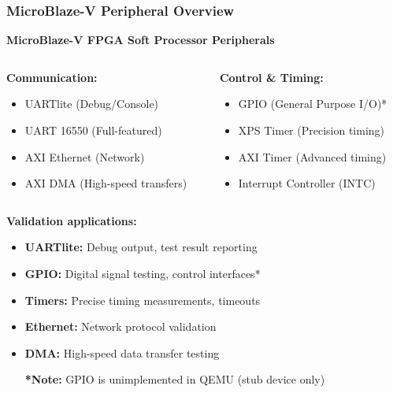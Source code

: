 \documentclass{beamer}
\begin{document}
\begin{frame}
\frametitle{MicroBlaze-V Peripheral Overview}

\begin{center}
\textbf{MicroBlaze-V FPGA Soft Processor Peripherals}
\end{center}

\begin{columns}[T]
\begin{column}{0.5\textwidth}
\textbf{Communication:}
\begin{itemize}
    \item \footnotesize UARTlite (Debug/Console)
    \item \footnotesize UART 16550 (Full-featured)
    \item \footnotesize AXI Ethernet (Network)
    \item \footnotesize AXI DMA (High-speed transfers)
\end{itemize}
\end{column}
\begin{column}{0.5\textwidth}
\textbf{Control \& Timing:}
\begin{itemize}
    \item \footnotesize GPIO (General Purpose I/O)*
    \item \footnotesize XPS Timer (Precision timing)
    \item \footnotesize AXI Timer (Advanced timing)
    \item \footnotesize Interrupt Controller (INTC)
\end{itemize}
\end{column}
\end{columns}

\vspace{0.5cm}
\textbf{Validation applications:}
\begin{itemize}
    \item \footnotesize \textbf{UARTlite:} Debug output, test result reporting
    \item \footnotesize \textbf{GPIO:} Digital signal testing, control interfaces*
    \item \footnotesize \textbf{Timers:} Precise timing measurements, timeouts
    \item \footnotesize \textbf{Ethernet:} Network protocol validation
    \item \footnotesize \textbf{DMA:} High-speed data transfer testing

\vspace{0.2cm}
\footnotesize \textbf{*Note:} GPIO is unimplemented in QEMU (stub device only)
\end{itemize}
\end{frame}
\end{document}
